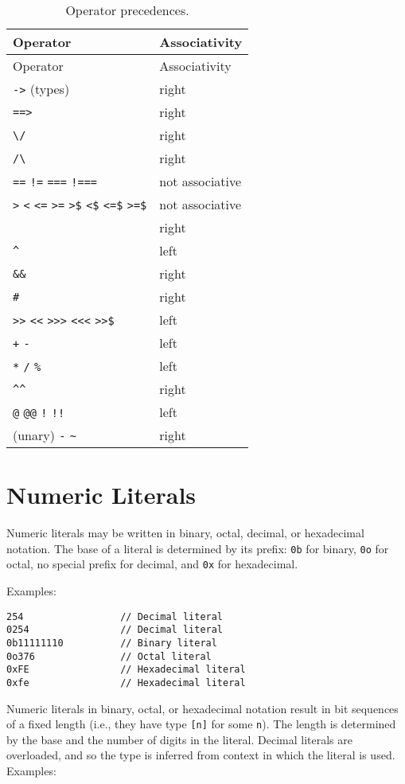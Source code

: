 \begin{longtable}[c]{@{}ll@{}}
\caption{Operator precedences.}\tabularnewline
\toprule
Operator & Associativity\tabularnewline
\midrule
\endfirsthead
\toprule
Operator & Associativity\tabularnewline
\midrule
\endhead
\texttt{-\textgreater{}} (types) & right\tabularnewline
\texttt{==\textgreater{}} & right\tabularnewline
\texttt{\textbackslash{}/} & right\tabularnewline
\texttt{/\textbackslash{}} & right\tabularnewline
\texttt{==} \texttt{!=} \texttt{===} \texttt{!===} & not associative\tabularnewline
\texttt{\textgreater{}} \texttt{\textless{}} \texttt{\textless{}=} \texttt{\textgreater{}=}
\texttt{\textgreater{}\$} \texttt{\textless{}\$} \texttt{\textless{}=\$} \texttt{\textgreater{}=\$}
& not associative\tabularnewline
\texttt{\textbar{}\textbar{}} & right\tabularnewline
\texttt{\^{}} & left\tabularnewline
\texttt{\&\&} & right\tabularnewline
\texttt{\#} & right\tabularnewline
\texttt{\textgreater{}\textgreater{}} \texttt{\textless{}\textless{}}
\texttt{\textgreater{}\textgreater{}\textgreater{}}
\texttt{\textless{}\textless{}\textless{}}
\texttt{\textgreater{}\textgreater{}\$} & left\tabularnewline
\texttt{+} \texttt{-} & left\tabularnewline
\texttt{*} \texttt{/} \texttt{\%} & left\tabularnewline
\texttt{\^{}\^{}} & right\tabularnewline
\texttt{@} \texttt{@@} \texttt{!} \texttt{!!} & left\tabularnewline
(unary) \texttt{-} \texttt{\textasciitilde{}} & right\tabularnewline
\bottomrule
\end{longtable}

\section{Numeric Literals}\label{numeric-literals}

Numeric literals may be written in binary, octal, decimal, or
hexadecimal notation. The base of a literal is determined by its prefix:
\texttt{0b} for binary, \texttt{0o} for octal, no special prefix for
decimal, and \texttt{0x} for hexadecimal.

Examples:

\begin{verbatim}
254                 // Decimal literal
0254                // Decimal literal
0b11111110          // Binary literal
0o376               // Octal literal
0xFE                // Hexadecimal literal
0xfe                // Hexadecimal literal
\end{verbatim}

Numeric literals in binary, octal, or hexadecimal notation result in
bit sequences of a fixed length (i.e., they have type \texttt{[n]} for
some \texttt{n}). The length is determined by the base and the number
of digits in the literal. Decimal literals are overloaded, and so the
type is inferred from context in which the literal is used. Examples:

